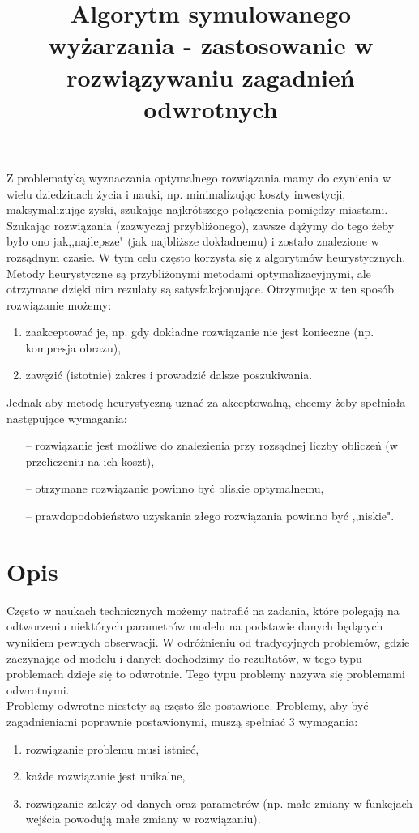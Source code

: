 \documentclass[twoside]{projektInzynierskiMS1}
\title{Algorytm symulowanego wyżarzania - zastosowanie w rozwiązywaniu zagadnień odwrotnych}
\newcommand{\si}{ś}
\begin{document}
Z problematyką wyznaczania optymalnego rozwiązania mamy do czynienia w wielu dziedzinach życia i nauki, np. minimalizując koszty inwestycji, maksymalizując zyski, szukając najkrótszego połączenia pomiędzy miastami. Szukając rozwiązania (zazwyczaj przybliżonego), zawsze dążymy do tego żeby było ono jak,,najlepsze" (jak najbliższe dokładnemu) i zostało znalezione w rozsądnym czasie. W tym celu często korzysta się z algorytmów heurystycznych. \\ 


Metody heurystyczne są przybliżonymi metodami optymalizacyjnymi, ale otrzymane dzięki nim rezulaty są satysfakcjonujące. Otrzymując w ten sposób rozwiązanie możemy:

\begin{enumerate}
	\item zaakceptować je, np. gdy dokładne rozwiązanie nie jest konieczne (np. kompresja obrazu),
	\item zawęzić (istotnie) zakres i prowadzić dalsze poszukiwania. \\
\end{enumerate}
Jednak aby metodę heurystyczną uznać za akceptowalną, chcemy żeby spełniała następujące wymagania:
\begin{itemize}
	\item[--] rozwiązanie jest możliwe do znalezienia przy rozsądnej liczby obliczeń (w przeliczeniu na ich koszt),
	\item[--] otrzymane rozwiązanie powinno być bliskie optymalnemu,
	\item[--] prawdopodobieństwo uzyskania złego rozwiązania powinno być ,,niskie".
\end{itemize}

\section{Opis}
Często w naukach technicznych możemy natrafić na zadania, które polegają na odtworzeniu niektórych parametrów modelu na podstawie danych będących wynikiem pewnych obserwacji. W odróżnieniu od tradycyjnych problemów, gdzie zaczynając od modelu i danych dochodzimy do rezultatów, w tego typu problemach dzieje się to odwrotnie. Tego typu problemy nazywa się problemami odwrotnymi. \\

Problemy odwrotne niestety są często źle postawione. Problemy, aby być zagadnieniami poprawnie postawionymi, muszą spełniać 3 wymagania:
\begin{enumerate}
	\item rozwiązanie problemu musi istnieć,
	\item każde rozwiązanie jest unikalne,
	\item rozwiązanie zależy od danych oraz parametrów (np. małe zmiany w funkcjach wej\si cia powodują małe zmiany w rozwiązaniu). \\
\end{enumerate}
\end{document}

